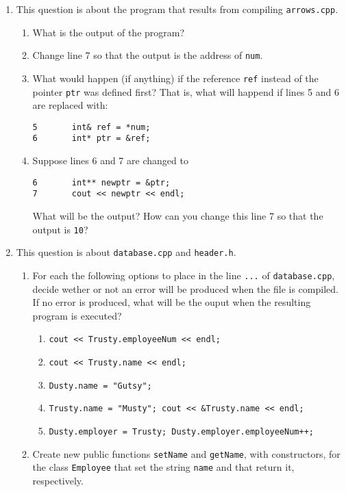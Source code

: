 \documentclass[a4paper,12pt]{article}
\begin{document}
\begin{enumerate}
\item This question is about the program that results from compiling \texttt{arrows.cpp}.
\begin{enumerate}
\item What is the output of the program?
\item Change line 7 so that the output is the address of \texttt{num}.
\item What would happen (if anything) if the reference \texttt{ref} instead of the pointer \texttt{ptr} was defined first? That is, what will happend if lines 5 and 6 are replaced with:
\begin{verbatim}
5       int& ref = *num;
6       int* ptr = &ref;
\end{verbatim}
\item Suppose lines 6 and 7 are changed to 
\begin{verbatim}
6       int** newptr = &ptr;
7       cout << newptr << endl;
\end{verbatim}
What will be the output? How can you change this line 7 so that the output is \texttt{10}?
\end{enumerate}

\vfill

\item This question is about \texttt{database.cpp} and \texttt{header.h}.
\begin{enumerate}
\item For each the following options to place in the line \texttt{...} of \texttt{database.cpp}, decide wether or not an error will be produced when the file is compiled. If no error is produced, what will be the ouput when the resulting program is executed?
\begin{enumerate}
\item \texttt{cout << Trusty.employeeNum << endl;}
\item \texttt{cout << Trusty.name << endl;}
\item \texttt{Dusty.name = "Gutsy";}
\item \texttt{Trusty.name = "Musty"; cout << \&Trusty.name << endl;}
\item \texttt{Dusty.employer = Trusty; Dusty.employer.employeeNum++;}
\end{enumerate}
\item Create new public functions \texttt{setName} and \texttt{getName}, with constructors, for the class \texttt{Employee} that set the string \texttt{name} and that return it, respectively.
\end{enumerate}
\end{enumerate}
\end{document}
